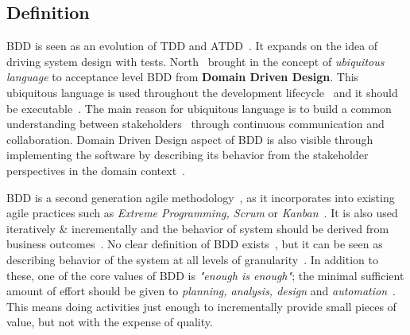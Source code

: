     \subsection{Definition}
    BDD is seen as an evolution of TDD and ATDD~\cite{solis2011study}. It expands on the idea of driving system design with
    tests. North~\cite{bdd2006north} brought in the concept of \textit{ubiquitous language} to acceptance level BDD from \textbf{Domain Driven Design}.
    This ubiquitous language is used throughout the development lifecycle~\cite{solis2011study} and it should be executable~\cite{bdd2006north}.
    The main reason for ubiquitous language is to build a common understanding between stakeholders~\cite{solis2011study} through
    continuous communication and collaboration.
    Domain Driven Design aspect of BDD is also visible through implementing the software by describing its behavior from
    the stakeholder perspectives in the domain context~\cite{chelimsky2010rspec}.

    BDD is a second generation agile methodology~\cite{chelimsky2010rspec}, as it incorporates into existing agile practices such as
    \textit{Extreme Programming, Scrum} or \textit{Kanban}~\cite{smart2014bdd}. It is also used iteratively \& incrementally and the behavior
    of system should be derived from business outcomes~\cite{solis2011study}.
    No clear definition of BDD exists~\cite{okolnychyi2016study}, but it can be seen as describing behavior of the system
    at all levels of granularity~\cite{chelimsky2010rspec}.
    In addition to these, one of the core values of BDD is \textit{"enough is enough"};
    the minimal sufficient amount of effort should be given to \textit{planning, analysis, design} and \textit{automation}~\cite{chelimsky2010rspec}.
    This means doing activities just enough to incrementally provide small pieces of value, but not with the expense of
    quality.

